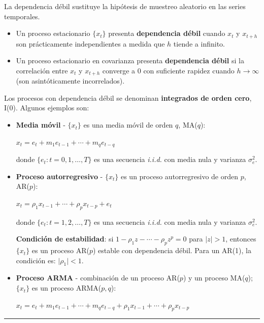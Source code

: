 \begin{f}
	
	La dependencia débil sustituye la hipótesis de muestreo aleatorio en las series temporales.
	
	\begin{itemize}[leftmargin=*]
		\item Un proceso estacionario \(\lbrace x_{t} \rbrace\) presenta \textbf{dependencia débil} cuando \(x_{t}\) y \(x_{t+h}\) son prácticamente independientes a medida que \(h\) tiende a infinito.
		
		\item Un proceso estacionario en covarianza presenta \textbf{dependencia débil} si la correlación entre \(x_{t}\) y \(x_{t+h}\) converge a \(0\) con suficiente rapidez cuando \(h \rightarrow \infty\) (son asintóticamente incorrelados).
	\end{itemize}
	
	Los procesos con dependencia débil se denominan \textbf{integrados de orden cero}, I(0). Algunos ejemplos son:
	
	\begin{itemize}[leftmargin=*]
		
		\item \textbf{Media móvil} - \(\lbrace x_{t} \rbrace\) es una media móvil de orden \(q\), MA(\(q\)):
		
		\begin{center}
			\(x_{t}=e_{t}+m_{1}e_{t-1}+\cdots+m_{q}e_{t-q}\)
		\end{center}
		
		donde \(\lbrace e_{t}:t=0,1,\ldots,T\rbrace\) es una secuencia \textsl{i.i.d.} con media nula y varianza \(\sigma_{e}^{2}\).
		
		\item \textbf{Proceso autorregresivo} - \(\lbrace x_{t} \rbrace\) es un proceso autorregresivo de orden \(p\), AR(\(p\)):
		
		\begin{center}
			\(x_{t}=\rho_{1}x_{t-1}+\cdots+\rho_{p}x_{t-p}+e_{t}\)
		\end{center}
		
		donde \(\lbrace e_{t}:t=1,2,\ldots,T\rbrace\) es una secuencia \textsl{i.i.d.} con media nula y varianza \(\sigma_{e}^{2}\).
		
		\textbf{Condición de estabilidad}: si \(1-\rho_{1}z-\cdots-\rho_{p}z^{p}=0\) para \(\lvert z\rvert>1\), entonces \(\lbrace x_{t}\rbrace\) es un proceso AR(\(p\)) estable con dependencia débil. Para un AR(1), la condición es: \(\lvert\rho_{1}\rvert<1\).
		
		\item \textbf{Proceso ARMA} - combinación de un proceso AR(\(p\)) y un proceso MA(\(q\)); \(\lbrace x_{t}\rbrace\) es un proceso ARMA(\(p,q\)):
		
		\begin{center}
			\(x_{t}=e_{t}+m_{1}e_{t-1}+\cdots+m_{q}e_{t-q}+\rho_{1}x_{t-1}+\cdots+\rho_{p}x_{t-p}\)
		\end{center}
		
	\end{itemize}
	
\end{f}  \hrule

